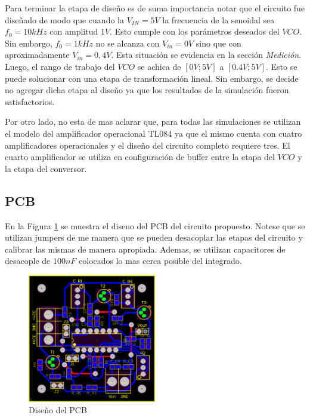 Para terminar la etapa de diseño es de suma importancia notar que el circuito fue diseñado de modo que cuando la $V_{IN} = 5V$ la frecuencia de la senoidal sea $f_0 = 10kHz$ con amplitud $1V$. Esto cumple con los parámetros deseados del $VCO$. Sin embargo, $f_0 = 1kHz$ no se alcanza con $V_{in} = 0V$ sino que con aproximadamente $V_{in} = 0,4 V$. Esta situación se evidencia en la sección \textit{Medición}. Luego, el rango de trabajo del $VCO$ se achica de $[0V;5V]$ a $[0.4V;5V]$. Esto se puede solucionar con una etapa de transformación lineal. Sin embargo, se decide no agregar dicha etapa al diseño ya que los resultados de la simulación fueron satisfactorios. 

Por otro lado, no esta de mas aclarar que, para todas las simulaciones se utilizan el modelo del amplificador operacional TL084 ya que el mismo cuenta con cuatro amplificadores operacionales y el diseño del circuito completo requiere tres. El cuarto amplificador se utiliza en configuración de buffer entre la etapa del $VCO$ y la etapa del conversor. 

\subsection{PCB}
En la Figura \ref{fig:pcb} se muestra el diseno del PCB del circuito propuesto. Notese que se utilizan jumpers de me manera que se pueden desacoplar las etapas del circuito y calibrar las mismas de manera apropiada. Ademas, se utilizan capacitores de desacople de $100nF$ colocados lo mas cerca posible del integrado. 

\begin{figure}[h!]                                                       
    \centering\includegraphics[width=0.5\textwidth]{../Ex3/Resources/pcb.png}
    \caption{Diseño del PCB}
    \label{fig:pcb}
    \end{figure}


